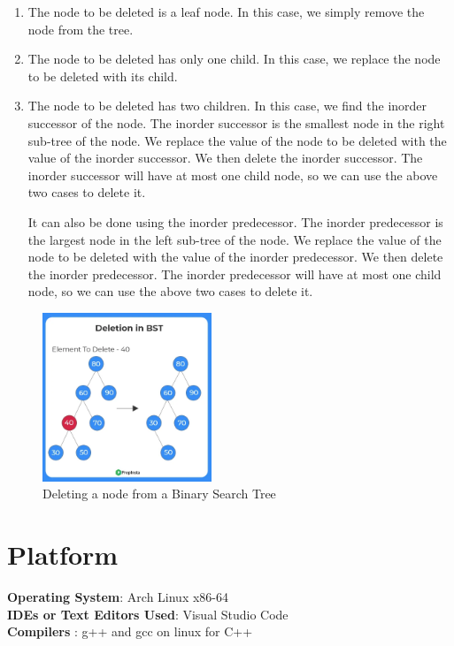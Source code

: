 \documentclass[11pt]{article}
\begin{document}
\begin{enumerate}
    \item The node to be deleted is a leaf node. In this case, we simply remove the node from the tree.
    \item The node to be deleted has only one child. In this case, we replace the node to be deleted with its child.
    \item The node to be deleted has two children. In this case, we find the inorder successor of the node. The inorder successor is the smallest node in the right sub-tree of the node. We replace the value of the node to be deleted with the value of the inorder successor. We then delete the inorder successor. The inorder successor will have at most one child node, so we can use the above two cases to delete it.

          It can also be done using the inorder predecessor. The inorder predecessor is the largest node in the left sub-tree of the node. We replace the value of the node to be deleted with the value of the inorder predecessor. We then delete the inorder predecessor. The inorder predecessor will have at most one child node, so we can use the above two cases to delete it.
\end{enumerate}

\begin{figure}[H]
    \centering
    \includegraphics[width=0.45\textwidth]{figures/Deletion_BST.png}
    \caption{Deleting a node from a Binary Search Tree}
    \label{fig:Deleting a node from a Binary Search Tree}
\end{figure}

\section{Platform}
\textbf{Operating System}: Arch Linux x86-64 \\
\textbf{IDEs or Text Editors Used}: Visual Studio Code\\
\textbf{Compilers} : g++ and gcc on linux for C++\\
\end{document}
